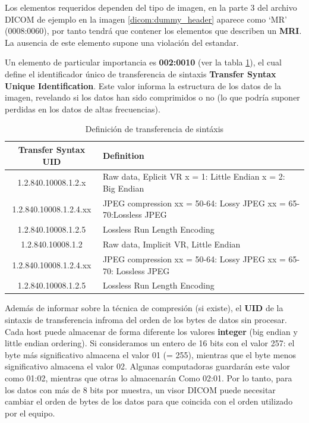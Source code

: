 Los elementos requeridos dependen del tipo de imagen, en la parte 3 del archivo DICOM de ejemplo en la imagen \ref{dicom:dummy_header} aparece como `MR' (0008:0060), por tanto tendrá que contener los elementos que describen un \textbf{MRI}. La ausencia de este elemento supone una violación del estandar.

Un elemento de particular importancia es \textbf{002:0010} (ver la tabla \ref{dicom:tab_sintaxis}), el cual define el identificador único de transferencia de sintaxis \textbf{Transfer Syntax Unique Identification}. Este valor informa la estructura de los datos de la imagen, revelando si los datos han sido comprimidos o no (lo que podría suponer perdidas en los datos de altas frecuencias).

\begin{table}[H]
  \centering
    	\tiny
  \begin{tabular}{|c|l|}
    \hline
    Transfer Syntax UID	& Definition \\
    \hline
    1.2.840.10008.1.2.x	& Raw data, Eplicit VR x = 1: Little Endian x = 2: Big Endian \\
	1.2.840.10008.1.2.4.xx &	JPEG compression xx = 50-64: Lossy JPEG xx = 65-70:Lossless JPEG \\
	1.2.840.10008.1.2.5	& Lossless Run Length Encoding  \\
    1.2.840.10008.1.2 		&	Raw data, Implicit VR, Little Endian \\	
    1.2.840.10008.1.2.4.xx & JPEG compression xx = 50-64: Lossy JPEG xx = 65-70: Lossless JPEG \\
    1.2.840.10008.1.2.5 & Lossless Run Length Encoding \\
    \hline
  \end{tabular}
  \caption{Definición de transferencia de sintáxis}\label{dicom:tab_sintaxis}

\end{table}

Además de informar sobre la técnica de compresión (si existe), el \textbf{UID} de la sintaxis de transferencia infroma del orden de los bytes de datos sin procesar. Cada host puede almacenar de forma diferente los valores \textbf{integer} (big endian y little endian ordering). Si consideramos un entero de 16 bits con el valor 257: el byte más significativo almacena el valor 01 (= 255), mientras que el byte menos significativo almacena el valor 02. Algunas computadoras guardarán este valor como 01:02, mientras que otras lo almacenarán Como 02:01. Por lo tanto, para los datos con más de 8 bits por muestra, un visor DICOM puede necesitar cambiar el orden de bytes de los datos para que coincida con el orden utilizado por el equipo.

